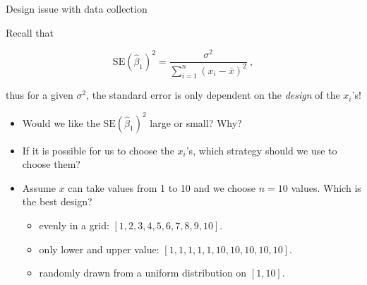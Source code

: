 \documentclass[10pt,ignorenonframetext,]{beamer}
\providecommand{\tightlist}{%
  \setlength{\itemsep}{0pt}\setlength{\parskip}{0pt}}
\begin{document}
\begin{frame}

\begin{block}{Design issue with data collection}

\vspace{2mm} Recall that

\[\text{SE}(\hat{\beta}_1)^2 = \frac{\sigma^2}{\sum_{i=1}^n (x_i-\bar{x})^2} \ ,\]

thus for a given \(\sigma^2\), the standard error is only dependent on
the \emph{design} of the \(x_i\)'s!

\begin{itemize}
\tightlist
\item
  Would we like the \(\text{SE}(\hat{\beta}_1)^2\) large or small? Why?
\item
  If it is possible for us to choose the \(x_i\)'s, which strategy
  should we use to choose them?
\item
  Assume \(x\) can take values from 1 to 10 and we choose \(n=10\)
  values. Which is the best design?

  \begin{itemize}
  \tightlist
  \item
    evenly in a grid: \([1,2,3,4,5,6,7,8,9,10]\).
  \item
    only lower and upper value: \([1,1,1,1,1,10,10,10,10,10]\).
  \item
    randomly drawn from a uniform distribution on \([1,10]\).
  \end{itemize}
\end{itemize}

\end{block}

\end{frame}
\end{document}
